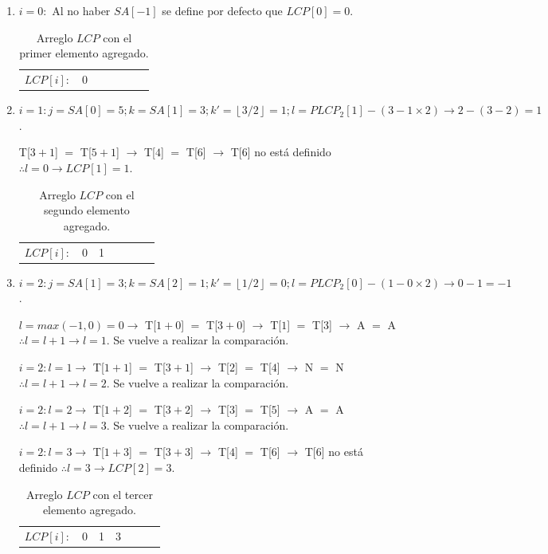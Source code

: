 \begin{enumerate}

\item $i=0:$ Al no haber $SA[-1]$ se define por defecto que $LCP[0] = 0$.

\begin{table}[!htb]
\centering
\begin{tabular}{c|c|c|c|c|c|c|}
\cline{2-7}
$LCP[i]:$ & 0 &  &  &  &  & \\ \cline{2-7}
\end{tabular}
\caption{Arreglo $LCP$ con el primer elemento agregado.}
\end{table}

\item $i=1: j=SA[0]=5; k=SA[1]=3; k'= \left \lfloor{3/2}\right \rfloor = 1; l= PLCP_{2}[1] - (3-1 \times 2) \rightarrow 2-(3-2)=1$.

T[$3+1$] $=$ T[$5+1$] $\rightarrow$ T[$4$] $=$ T[$6$] $\rightarrow$ T[$6$] no está definido $\therefore l=0 \rightarrow LCP[1] = 1$.

\begin{table}[!htb]
\centering
\begin{tabular}{c|c|c|c|c|c|c|}
\cline{2-7}
$LCP[i]:$ & 0 & 1 &  &  &  & \\ \cline{2-7}
\end{tabular}
\caption{Arreglo $LCP$ con el segundo elemento agregado.}
\end{table}

\item $i=2: j=SA[1]=3; k=SA[2]=1; k'= \left \lfloor{1/2}\right \rfloor = 0; l= PLCP_{2}[0] - (1-0 \times 2) \rightarrow 0-1=-1$.

$l=max(-1,0)=0 \rightarrow$ T[$1+0$] $=$ T[$3+0$] $\rightarrow$ T[$1$] $=$ T[$3$] $\rightarrow$ A $=$ A $\therefore l=l+1 \rightarrow l=1$. Se vuelve a realizar la comparación.

$i=2: l=1 \rightarrow$ T[$1+1$] $=$ T[$3+1$] $\rightarrow$ T[$2$] $=$ T[$4$] $\rightarrow$ N $=$ N $\therefore l=l+1 \rightarrow l=2$. Se vuelve a realizar la comparación.

$i=2: l=2 \rightarrow$ T[$1+2$] $=$ T[$3+2$] $\rightarrow$ T[$3$] $=$ T[$5$] $\rightarrow$ A $=$ A $\therefore l=l+1 \rightarrow l=3$. Se vuelve a realizar la comparación.

$i=2: l=3 \rightarrow$ T[$1+3$] $=$ T[$3+3$] $\rightarrow$ T[$4$] $=$ T[$6$] $\rightarrow$ T[$6$] no está definido $\therefore l=3 \rightarrow LCP[2] = 3$.

\begin{table}[!htb]
\centering
\begin{tabular}{c|c|c|c|c|c|c|}
\cline{2-7}
$LCP[i]:$ & 0 & 1 & 3 &  &  & \\ \cline{2-7}
\end{tabular}
\caption{Arreglo $LCP$ con el tercer elemento agregado.}
\end{table}


\end{enumerate}
